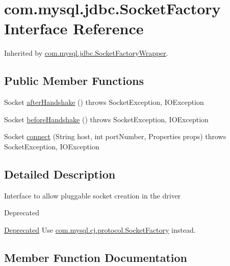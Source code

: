 \hypertarget{interfacecom_1_1mysql_1_1jdbc_1_1_socket_factory}{}\section{com.\+mysql.\+jdbc.\+Socket\+Factory Interface Reference}
\label{interfacecom_1_1mysql_1_1jdbc_1_1_socket_factory}


Inherited by \mbox{\hyperlink{classcom_1_1mysql_1_1jdbc_1_1_socket_factory_wrapper}{com.\+mysql.\+jdbc.\+Socket\+Factory\+Wrapper}}.

\subsection*{Public Member Functions}
\begin{DoxyCompactItemize}
\item 
Socket \mbox{\hyperlink{interfacecom_1_1mysql_1_1jdbc_1_1_socket_factory_adc5277dd008da61b24261a983202f5bf}{after\+Handshake}} ()  throws Socket\+Exception, I\+O\+Exception
\item 
Socket \mbox{\hyperlink{interfacecom_1_1mysql_1_1jdbc_1_1_socket_factory_aa9a78553a76681f49c734aaa3f8f126b}{before\+Handshake}} ()  throws Socket\+Exception, I\+O\+Exception
\item 
Socket \mbox{\hyperlink{interfacecom_1_1mysql_1_1jdbc_1_1_socket_factory_a2e5061cef1109ab4689437fe177c4ffe}{connect}} (String host, int port\+Number, Properties props)  throws Socket\+Exception, I\+O\+Exception
\end{DoxyCompactItemize}


\subsection{Detailed Description}
Interface to allow pluggable socket creation in the driver

\begin{DoxyRefDesc}{Deprecated}
\item[\mbox{\hyperlink{deprecated__deprecated000001}{Deprecated}}]Use \mbox{\hyperlink{interfacecom_1_1mysql_1_1cj_1_1protocol_1_1_socket_factory}{com.\+mysql.\+cj.\+protocol.\+Socket\+Factory}} instead. \end{DoxyRefDesc}


\subsection{Member Function Documentation}
\mbox{\label{interfacecom_1_1mysql_1_1jdbc_1_1_socket_factory_adc5277dd008da61b24261a983202f5bf}} 
